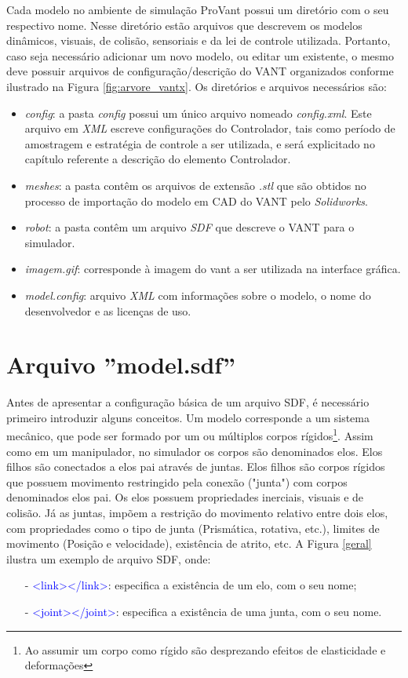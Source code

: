 Cada modelo no ambiente de simulação ProVant possui um diretório com o seu respectivo nome. Nesse diretório estão arquivos que descrevem os modelos dinâmicos, visuais, de colisão, sensoriais e da lei de controle utilizada. Portanto, caso seja necessário adicionar um novo modelo, ou editar um existente, o mesmo deve possuir arquivos de configuração/descrição do VANT organizados conforme ilustrado na Figura \ref{fig:arvore_vantx}. Os diretórios e arquivos necessários são:
 
\begin{itemize}
\item\emph{config}:  a pasta \emph{config} possui um único arquivo nomeado \emph{config.xml}. Este arquivo em \emph{XML} escreve configurações do Controlador, tais como período de amostragem e estratégia de controle a ser utilizada, e será explicitado no capítulo referente a descrição do elemento Controlador.
\item \emph{meshes}: a pasta contêm os arquivos de extensão \emph{.stl} que são obtidos no processo de importação do modelo em CAD do VANT pelo \emph{Solidworks}.
\item \emph{robot}: a pasta contêm um arquivo \emph{SDF} que descreve o VANT para o simulador.
\item \emph{imagem.gif}: corresponde à imagem do vant a ser utilizada na interface gráfica.
\item \emph{model.config}: arquivo \emph{XML} com informações sobre o modelo, o nome do desenvolvedor e as licenças de uso.
\end{itemize}



\section{Arquivo ''model.sdf''}


Antes de apresentar a configuração básica de um arquivo SDF, é necessário primeiro introduzir alguns conceitos. Um modelo corresponde a um sistema mecânico, que pode ser formado por um ou múltiplos corpos rígidos\footnote{Ao assumir um corpo como rígido são desprezando efeitos de elasticidade e deformações}. Assim como em um manipulador, no simulador os corpos são denominados elos. Elos filhos são conectados a elos pai através de juntas. Elos filhos são corpos rígidos que possuem movimento restringido pela conexão ("junta") com corpos denominados elos pai. Os elos possuem propriedades inerciais, visuais e de colisão. Já as juntas, impõem a restrição do movimento relativo entre dois elos, com propriedades como o tipo de junta (Prismática, rotativa, etc.), limites de movimento (Posição e velocidade), existência de atrito, etc. A Figura \ref{geral} ilustra um exemplo de arquivo SDF, onde:\small
\begin{itemize}
\setlength{\itemsep}{1pt}
\setlength{\parskip}{0pt}
\setlength{\parsep}{0pt}
\item[-] \textcolor{blue}{<link></link>}: especifica a existência de um elo, com o seu nome;
\item[-] \textcolor{blue}{<joint></joint>}: especifica a existência de uma junta, com o seu nome.  
\end{itemize}\normalsize

